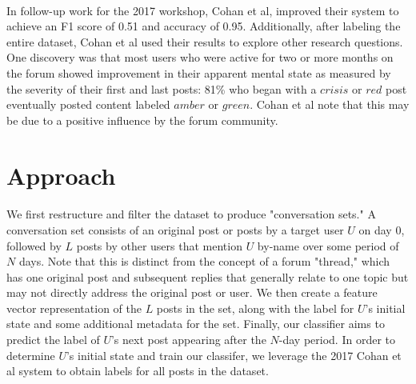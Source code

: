 \documentclass{article}
\begin{document}
\paragraph{}In follow-up work for the 2017 workshop, Cohan et al, improved their system to achieve an F1 score of 0.51 and accuracy of 0.95. Additionally, after labeling the entire dataset, Cohan et al used their results to explore other research questions. One discovery was that most users who were active for two or more months on the forum showed improvement in their apparent mental state as measured by the severity of their first and last posts: 81\% who began with a $crisis$ or $red$ post eventually posted content labeled $amber$ or $green$\cite{cohan2}. Cohan et al note that this may be due to a positive influence by the forum community.

\section{Approach}

\paragraph{}We first restructure and filter the dataset to produce "conversation sets." A conversation set consists of an original post or posts by a target user $U$ on day 0, followed by $L$ posts by other users that mention $U$ by-name over some period of $N$ days. Note that this is distinct from the concept of a forum "thread," which has one original post and subsequent replies that generally relate to one topic but may not directly address the original post or user. We then create a feature vector representation of the $L$ posts in the set, along with the label for $U$'s initial state and some additional metadata for the set. Finally, our classifier aims to predict the label of $U$'s next post appearing after the $N$-day period. In order to determine $U$'s initial state and train our classifer, we leverage the 2017 Cohan et al system to obtain labels for all posts in the dataset.
\end{document}
